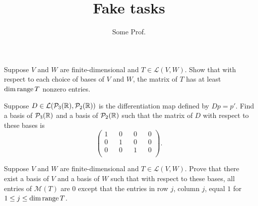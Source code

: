 \documentclass{math}
\title{Fake tasks}
\author{Some Prof.}
\begin{document}
	\maketitle
	
	\begin{exercise}[1212]
		Suppose $V$ and $W$ are finite-dimensional and $T \in \mathcal{L}(V, W)$. Show that with respect to each choice of bases of $V$ and $W$, the matrix of $T$ has at least $\dim \operatorname{range} T$ nonzero entries.
	\end{exercise}
	
	\begin{exercise}[1243]
		Suppose $D \in \mathcal{L}(\mathcal{P}_3(\mathbb{R}),\mathcal{P}_2(\mathbb{R}))$ is the differentiation map defined by $Dp = p'$. Find a basis of $\mathcal{P}_3(\mathbb{R})$ and a basis of $\mathcal{P}_2(\mathbb{R})$ such that the matrix of $D$ with respect to these bases is
		\begin{equation*}
			\begin{pmatrix}
				1 && 0 && 0 && 0 \\
				0 && 1 && 0 && 0 \\
				0 && 0 && 1 && 0 \\
			\end{pmatrix}.
		\end{equation*}
	\end{exercise}
	
	\begin{exercise}[3471]
		Suppose $V$ and $W$ are finite-dimensional and $T \in \mathcal{L}(V, W)$. Prove that there exist a basis of $V$ and a basis of $W$ such that with respect to these bases, all entries of $\mathcal{M}(T)$ are $0$ except that the entries in row $j$, column $j$, equal $1$ for $1 \leq j \leq \dim \operatorname{range} T$.	
	\end{exercise}
\end{document}
